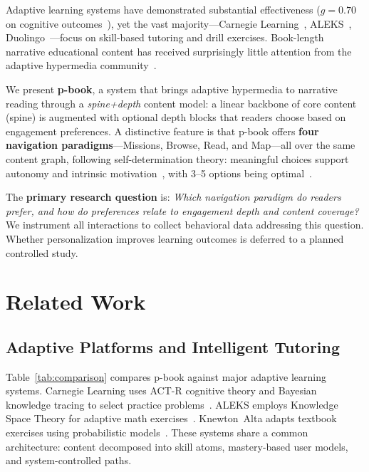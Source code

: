 \documentclass[sigconf]{acmart}
\begin{document}
Adaptive learning systems have demonstrated substantial effectiveness ($g{=}0.70$ on cognitive outcomes~\cite{wang2024}), yet the vast majority---Carnegie Learning~\cite{ritter2016}, ALEKS~\cite{cosyn2021}, Duolingo~\cite{settles2016}---focus on skill-based tutoring and drill exercises. Book-length narrative educational content has received surprisingly little attention from the adaptive hypermedia community~\cite{sosnovsky2025}.

We present \textbf{p-book}, a system that brings adaptive hypermedia to narrative reading through a \emph{spine+depth} content model: a linear backbone of core content (spine) is augmented with optional depth blocks that readers choose based on engagement preferences. A distinctive feature is that p-book offers \textbf{four navigation paradigms}---Missions, Browse, Read, and Map---all over the same content graph, following self-determination theory: meaningful choices support autonomy and intrinsic motivation~\cite{ryan2000}, with 3--5 options being optimal~\cite{evans2015,schneider2018}.

The \textbf{primary research question} is: \emph{Which navigation paradigm do readers prefer, and how do preferences relate to engagement depth and content coverage?} We instrument all interactions to collect behavioral data addressing this question. Whether personalization improves learning outcomes is deferred to a planned controlled study.

\section{Related Work}

\subsection{Adaptive Platforms and Intelligent Tutoring}

Table~\ref{tab:comparison} compares p-book against major adaptive learning systems. Carnegie Learning uses ACT-R cognitive theory and Bayesian knowledge tracing to select practice problems~\cite{ritter2016,desmarais2011}. ALEKS employs Knowledge Space Theory for adaptive math exercises~\cite{cosyn2021}. Knewton~Alta adapts textbook exercises using probabilistic models~\cite{chau2021}. These systems share a common architecture: content decomposed into skill atoms, mastery-based user models, and system-controlled paths.
\end{document}

